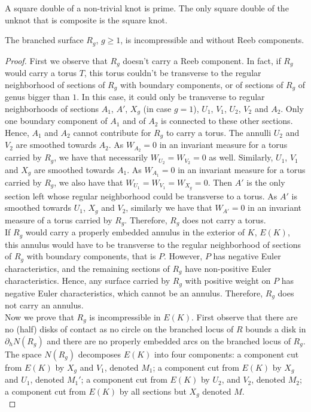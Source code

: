 \documentclass[10pt,a4paper]{amsart}
\begin{document}
\begin{lem}\label{lemma:prime}
A square double of a non-trivial knot is prime. The only square double of the unknot that is composite is the square knot.
\end{lem}

\begin{lem}\label{lemma:incompressible}
The branched surface $R_g$,  $g\geq 1$,  is incompressible and without Reeb components.
\end{lem}

\begin{proof}
First we observe that $R_g$ doesn't carry a Reeb component.  In fact,  if $R_g$ would carry a torus $T$,  this torus couldn't be transverse to the regular neighborhood of sections of $R_g$ with boundary components, or of sections of $R_g$ of genus bigger than $1$.  In this case,  it could only be transverse to regular neighborhoods of sections $A_1$, $A'$,  $X_g$ (in case $g=1$),  $U_1$,  $V_1$, $U_2$, $V_2$ and $A_2$.  Only one boundary component of $A_1$ and of $A_2$ is connected to these other sections. Hence, $A_1$ and $A_2$ cannot contribute for $R_g$ to carry a torus.  The annulli $U_2$ and $V_2$ are smoothed towards $A_2$.  As $W_{A_2}=0$ in an invariant measure for a torus carried by $R_g$,  we have that necessarily $W_{U_2}=W_{V_2}=0$ as well.  Similarly,  $U_1$, $V_1$ and $X_g$ are smoothed towards $A_1$.  As $W_{A_1}=0$ in an invariant measure for a torus carried by $R_g$,  we also have that  $W_{U_1}=W_{V_1}=W_{X_g}=0$.  Then $A'$ is the only section left whose regular neighborhood could be transverse to a torus.  As $A'$ is smoothed towards $U_1$,  $X_g$ and $V_2$, similarly we have that $W_{A'}=0$ in an invariant measure of a torus carried by $R_g$.  Therefore,  $R_g$ does not carry a torus.\\

If $R_g$ would carry a properly embedded annulus in the exterior of $K$,  $E(K)$,  this annulus would have to be transverse to the regular neighborhood of sections of $R_g$ with boundary components,  that is $P$. However, $P$ has negative Euler characteristics, and the remaining sections of $R_g$ have non-positive Euler characteristics. Hence, any surface carried by $R_g$ with positive weight on $P$ has negative Euler characteristics, which cannot be an annulus.  Therefore, $R_g$ does not carry an annulus.\\

								
Now we prove that $R_g$ is incompressible in $E(K)$. First observe that there are no (half) disks of contact as no circle on the branched locus of $R$ bounds a disk in $\partial_h N(R_g)$ and there are no properly embedded arcs on the branched locus of $R_g$. The space $N(R_g)$ decomposes $E(K)$ into four components: a component cut from $E(K)$ by $X_g$ and $V_1$, denoted $M_1$; a component cut from $E(K)$ by $X_g$ and $U_1$,  denoted $M_1'$; a component cut from $E(K)$ by $U_2$, and $V_2$, denoted $M_2$; a component cut from $E(K)$ by all sections but $X_g$ denoted $M$.\\


\end{proof}
\end{document}
